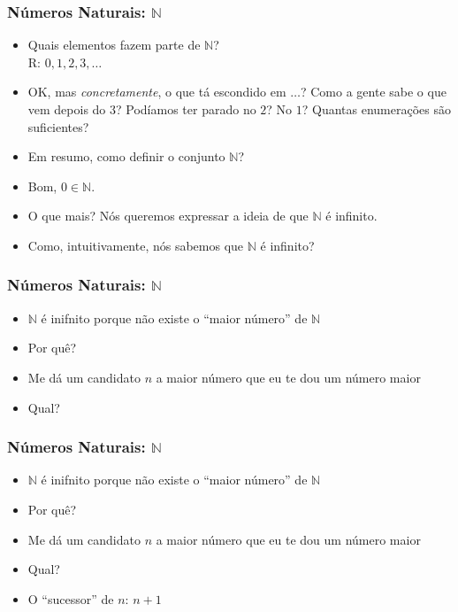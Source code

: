 \documentclass[usenames,dvipsnames,svgnames]{beamer}
\begin{document}
\begin{frame}	
	\frametitle{Números Naturais: $\mathbb{N}$}

	\begin{itemize}
		\item Quais elementos fazem parte de $\mathbb{N}$? \\ R: $0, 1, 2, 3, \dots$
		\item OK, mas \emph{concretamente}, o que tá escondido em $\dots$? Como a gente sabe o que vem depois do $3$? Podíamos ter parado no $2$? No $1$? Quantas enumerações são suficientes?
		\item Em resumo, como {\color{red}definir} o conjunto $\mathbb{N}$?
		\item Bom, $0 \in \mathbb{N}$.
		\item O que mais? Nós queremos expressar a ideia de que $\mathbb{N}$ é {\color{red}infinito}.
		\item Como, intuitivamente, nós sabemos que $\mathbb{N}$ é infinito?
 	\end{itemize}
\end{frame}

\begin{frame}	
	\frametitle{Números Naturais: $\mathbb{N}$}

	\begin{itemize}
		\item $\mathbb{N}$ é inifnito porque não existe o ``maior número'' de $\mathbb{N}$
		\item Por quê?
		\item Me dá um candidato $n$ a maior número que eu te dou um número maior
		\item Qual?
 	\end{itemize}
\end{frame}

\begin{frame}	
	\frametitle{Números Naturais: $\mathbb{N}$}

	\begin{itemize}
		\item $\mathbb{N}$ é inifnito porque não existe o ``maior número'' de $\mathbb{N}$
		\item Por quê?
		\item Me dá um candidato $n$ a maior número que eu te dou um número maior
		\item Qual?
		\item O ``sucessor'' de $n$: $n+1$
 	\end{itemize}
\end{frame}
\end{document}
